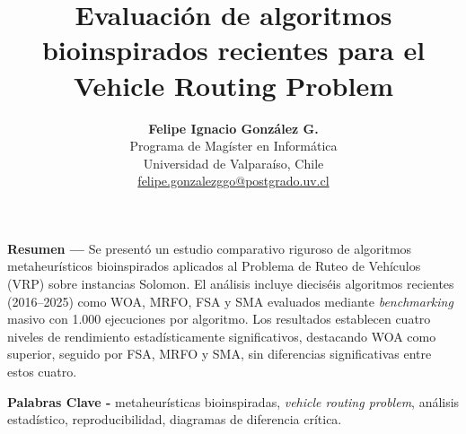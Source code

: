 \documentclass[10pt,a4paper]{extarticle}
\begin{document}
\title{Evaluación de algoritmos bioinspirados recientes para el Vehicle Routing Problem}
\author{%
  \begin{tabular}{c}
    \textbf{Felipe Ignacio González G.}\\
    Programa de Magíster en Informática\\
    Universidad de Valparaíso, Chile\\
    \href{mailto:felipe.gonzalezggo@postgrado.uv.cl}{felipe.gonzalezggo@postgrado.uv.cl}
  \end{tabular}}
\date{}
\maketitle

{\small
\noindent\textbf{Resumen ---} Se presentó un estudio comparativo riguroso de algoritmos metaheurísticos bioinspirados aplicados al Problema de Ruteo de Vehículos (VRP) sobre instancias Solomon. El análisis incluye dieciséis algoritmos recientes (2016--2025) como WOA, MRFO, FSA y SMA evaluados mediante \textit{benchmarking} masivo con 1.000 ejecuciones por algoritmo. Los resultados establecen cuatro niveles de rendimiento estadísticamente significativos, destacando WOA como superior, seguido por FSA, MRFO y SMA, sin diferencias significativas entre estos cuatro.

\noindent\textbf{Palabras Clave -} metaheurísticas bioinspiradas, \textit{vehicle routing problem}, análisis estadístico, reproducibilidad, diagramas de diferencia crítica.
}
\end{document}
